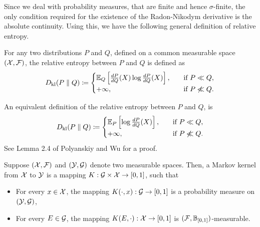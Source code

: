 

        Since we deal with probability measures, that are finite and hence $\sigma$-finite, the only condition required for the existence of the Radon-Nikodym derivative is the absolute continuity. Using this, we have the following general definition of relative entropy. 
        \begin{definition}
            \label{def:rel-ent-general} 
            For any two distributions $P$ and $Q$, defined on a common measurable space $(\mathcal{X}, \mathcal{F})$, the relative entropy between $P$ and $Q$ is defined as 
            \begin{align}
                D_{\text{kl}}(P \parallel Q) \coloneqq 
                \begin{cases}
                 \mathbb{E}_Q \left[ \frac{dP}{dQ}(X) \log \frac{dP}{dQ}(X) \right], & \quad \text{if } P\ll Q, \\
                 + \infty, & \quad \text{if } P \not \ll Q.  
                \end{cases}
            \end{align}
        \end{definition}

        \begin{fact}
            \label{fact:rel-ent-general-2}
            An equivalent definition of the relative entropy between $P$ and $Q$, is 
            \begin{align}
                D_{\text{kl}}(P \parallel Q) \coloneqq 
                \begin{cases}
                 \mathbb{E}_P \left[ \log \frac{dP}{dQ}(X) \right], & \quad \text{if } P\ll Q, \\
                 + \infty, & \quad \text{if } P \not \ll Q.  
                \end{cases}
            \end{align}
            See Lemma 2.4 of Polyanskiy and Wu for a proof. 
        \end{fact}
        \begin{definition}
            \label{def:markov-kernel} Suppose $(\mathcal{X}, \mathcal{F})$ and $(\mathcal{Y}, \mathcal{G})$ denote two measurable spaces. Then, a Markov kernel from $\mathcal{X}$ to $\mathcal{Y}$ is a mapping $K:\mathcal{G} \times \mathcal{X} \to [0,1]$, such that 
            \begin{itemize}
                \item For every $x \in \mathcal{X}$, the mapping $K(\cdot, x): \mathcal{G} \to [0,1]$ is a probability measure on $(\mathcal{Y}, \mathcal{G})$, 
                \item For every $E \in \mathcal{G}$, the mapping $K(E, \cdot): \mathcal{X} \to [0,1]$ is $(\mathcal{F}, \mathbb{B}_{[0,1]})$-measurable. 
            \end{itemize}
        \end{definition}        

